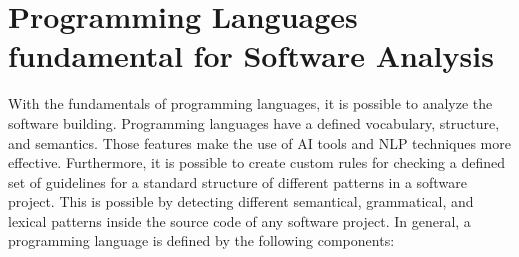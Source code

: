 \newpage

\section{Programming Languages fundamental for Software Analysis}
With the fundamentals of programming languages, it is possible to analyze the software building. Programming languages have a defined vocabulary, structure, and semantics. Those features make the use of AI tools and NLP techniques more effective. Furthermore, it is possible to create custom rules for checking a defined set of guidelines for a standard structure of different patterns in a software project. This is possible by detecting different semantical, grammatical, and lexical patterns inside the source code of any software project. In general, a programming language is defined by the following components:

